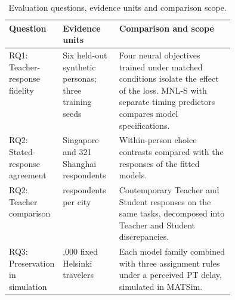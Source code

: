 \begin{table}[pos=htbp]
\centering\small
\caption{Evaluation questions, evidence units and comparison scope.}
\label{tab:study_design}
\renewcommand{\arraystretch}{1.13}
\begin{tabularx}{\linewidth}{@{}>{\raggedright\arraybackslash}p{0.19\linewidth}>{\raggedright\arraybackslash}p{0.25\linewidth}>{\raggedright\arraybackslash}X@{}}
\toprule
Question & Evidence units & Comparison and scope \\
\midrule
RQ1: Teacher-response fidelity & Six held-out synthetic personas; three training seeds & Four neural objectives trained under matched conditions isolate the effect of the loss. MNL-S with separate timing predictors compares model specifications. \\
RQ2: Stated-response agreement & 332 Singapore and 321 Shanghai respondents & Within-person choice contrasts compared with the responses of the fitted models. \\
RQ2: Teacher comparison & 24 respondents per city & Contemporary Teacher and Student responses on the same tasks, decomposed into Teacher and Student discrepancies. \\
RQ3: Preservation in simulation & 1,000 fixed Helsinki travelers & Each model family combined with three assignment rules under a perceived PT delay, simulated in MATSim. \\
\bottomrule
\end{tabularx}
\end{table}
